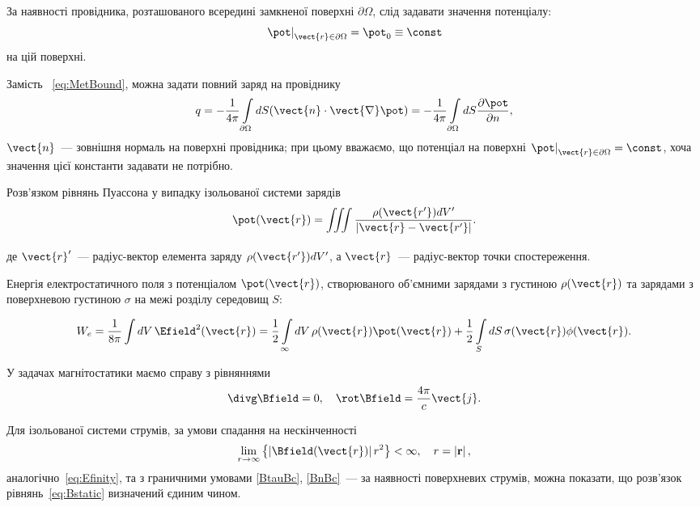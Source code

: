 \begin{Theory}
	За наявності провідника, розташованого всередині замкненої поверхні $\partial\Omega$,  слід задавати значення потенціалу:
	\begin{equation}\label{eq:MetBound}
		\left. \pot  \right|_{\vect{r} \in \partial \Omega}  = \pot_0 \equiv \const
	\end{equation}
	на цій поверхні.

	Замість~ \eqref{eq:MetBound}, можна задати повний заряд на провіднику
	\begin{equation}\label{}
		q = -\frac{1}{4\pi}\int\limits_{\partial\Omega} dS (\vect{n}\cdot\vect{\nabla}\pot) =  -\frac{1}{4\pi}\int\limits_{\partial\Omega} dS \frac{\partial \pot}{\partial n},
	\end{equation}
    $\vect{n}$~---	зовнішня нормаль на поверхні провідника; при цьому вважаємо, що потенціал на поверхні $\left. \pot  \right|_{\vect{r} \in \partial \Omega}  = \const$, хоча значення цієї константи задавати не потрібно.


	Розв'язком рівнянь Пуассона у випадку ізольованої системи зарядів
	\begin{equation}\label{Supperposition_principle}
		\pot(\vect{r}) = \iiint\limits_{} \frac{\rho(\vect{r'}) dV'}{\left| \vect{r} - \vect{r'} \right|}.
	\end{equation}
	де $\vect{r}'$~--- радіус-вектор елемента заряду $\rho(\vect{r'}) dV'$, а $\vect{r}$~--- радіус-вектор точки спостереження.

Енергія електростатичного поля з потенціалом $\pot(\vect{r})$, створюваного об’ємними зарядами з густиною $\rho(\vect{r})$  та зарядами з поверхневою густиною $\sigma$  на межі розділу середовищ $S$:  


\begin{equation}\label{eq:We}
W_e = \frac{1}{8\pi}\int {dV} \, \Efield^2(\vect{r}) = \frac{1}{2}\int\limits_\infty  dV\, \rho (\vect{r}) \pot(\vect{r}) + \frac{1}{2}\int\limits_S dS\, \sigma(\vect{r}) \phi (\vect{r}).
\end{equation}


	У задачах магнітостатики маємо справу з рівняннями
	\begin{equation}\label{eq:Bstatic}
		\divg\Bfield = 0, \quad \rot\Bfield = \frac{4\pi}{c}\vect{j}.
	\end{equation}

	Для ізольованої системи струмів, за умови спадання на нескінченності
	\begin{equation}\label{}
		\lim\limits_{r \to \infty } \left\{ {\left| \Bfield(\vect{r}) \right|{r^2}} \right\} < \infty ,\quad r = \left| {\bf{r}} \right|,
	\end{equation}
	аналогічно~\eqref{eq:Efinity}, та з граничними умовами \eqref{BtauBc}, \eqref{BnBc}~--- за наявності поверхневих струмів, можна показати, що розв’язок рівнянь~\eqref{eq:Bstatic} визначений єдиним чином.


\end{Theory}
